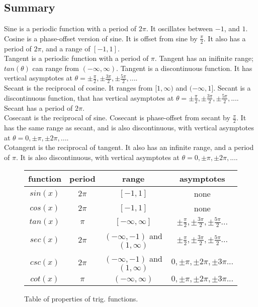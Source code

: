 \clearpage
\subsection{Summary}

Sine is a periodic function with a period of $2\pi$.  It oscillates between $-1$, and $1$. \\

Cosine is a phase-offset version of sine.  It is offset from sine by $\frac{\pi}{2}$.  It also has a period of $2\pi$, and a range of $[-1,1]$.\\

Tangent is a periodic function with a period of $\pi$.  Tangent has an inifinite range; $tan(\theta)$ can range from $(-\infty,\infty)$.  Tangent is a discontinuous function.  It has vertical asymptotes at $\theta = \pm \frac{\pi}{2}, \pm \frac{3\pi}{2}, \pm \frac{5\pi}{2},...$.\\

Secant is the reciprocal of cosine.  It ranges from $[1,\infty)$ and $(-\infty,1]$.  Secant is a discontinuous function, that has vertical asymptotes at $\theta = \pm \frac{\pi}{2}, \pm \frac{3\pi}{2}, \pm \frac{5\pi}{2},...$.  Secant has a period of $2\pi$.\\

Cosecant is the reciprocal of sine.  Cosecant is phase-offset from secant by $\frac{\pi}{2}$.  It has the same range as secant, and is also discontinuous, with vertical asymptotes at $\theta = 0, \pm \pi, \pm 2\pi,...$.\\

Cotangent is the reciprocal of tangent.  It also has an infinite range, and a period of $\pi$.  It is also discontinuous, with vertical asymptotes at $\theta = 0, \pm \pi, \pm 2\pi,...$.\\

\begin{figure}[htb]
\caption{Table of properties of trig. functions.}
\label{fig:table_of_properties}
\begin{center}
\begin{tabular}{|c|c|c|c|}
\hline 
function & period & range & asymptotes\\
\hline 
$sin(x)$ & $2\pi$ & $[-1,1]$ & none\\
\hline 
$cos(x)$ & $2\pi$ & $[-1,1]$ & none\\
\hline 
$tan(x)$ & $\pi$ & $[-\infty,\infty]$ & $\pm\frac{\pi}{2}, \pm\frac{3\pi}{2}, \pm\frac{5\pi}{2} ...$\\
\hline
$sec(x)$ & $2\pi$ & $(-\infty,-1)$ and $(1,\infty)$ & $\pm\frac{\pi}{2}, \pm\frac{3\pi}{2}, \pm\frac{5\pi}{2} ...$\\
\hline
$csc(x)$ & $2\pi$ & $(-\infty,-1)$ and $(1,\infty)$ & $0, \pm\pi, \pm2\pi, \pm3\pi ...$\\
\hline
$cot(x)$ & $\pi$ & $(-\infty,\infty)$ & $0, \pm\pi, \pm2\pi, \pm3\pi ...$\\
\hline
\end{tabular}
\end{center}
\end{figure}




